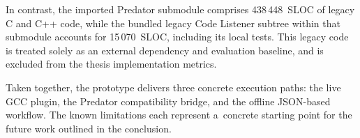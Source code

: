 \documentclass[xpsejal00-gcc-plugin.tex]{subfiles}
\begin{document}
In contrast, the imported Predator submodule comprises 438\,448~SLOC of legacy C and C++ code, while the bundled legacy Code Listener subtree within that submodule accounts for 15\,070~SLOC, including its local tests.
This legacy code is treated solely as an external dependency and evaluation baseline, and is excluded from the thesis implementation metrics.

Taken together, the prototype delivers three concrete execution paths: the live GCC plugin, the Predator compatibility bridge, and the offline JSON-based workflow.
The known limitations each represent a~concrete starting point for the future work outlined in the conclusion.
\end{document}
